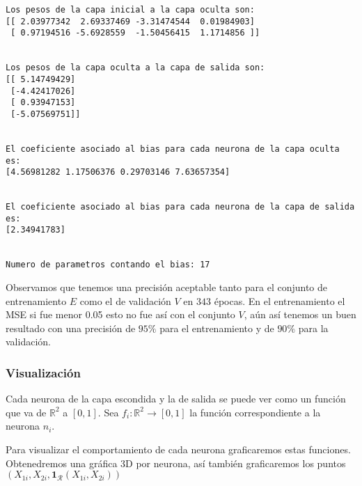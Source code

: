 \documentclass[11pt]{article}
\begin{document}
    \begin{Verbatim}[commandchars=\\\{\}]
Los pesos de la capa inicial a la capa oculta son:
[[ 2.03977342  2.69337469 -3.31474544  0.01984903]
 [ 0.97194516 -5.6928559  -1.50456415  1.1714856 ]]


Los pesos de la capa oculta a la capa de salida son:
[[ 5.14749429]
 [-4.42417026]
 [ 0.93947153]
 [-5.07569751]]


El coeficiente asociado al bias para cada neurona de la capa oculta es:
[4.56981282 1.17506376 0.29703146 7.63657354]


El coeficiente asociado al bias para cada neurona de la capa de salida es:
[2.34941783]


Numero de parametros contando el bias: 17
    \end{Verbatim}

    Observamos que tenemos una precisión aceptable tanto para el conjunto de
entrenamiento \(E\) como el de validación \(V\) en \(343\) épocas. En el
entrenamiento el MSE si fue menor 0.05 esto no fue así con el conjunto
\(V\), aún así tenemos un buen resultado con una precisión de \(95\%\)
para el entrenamiento y de \(90\%\) para la validación.

    \hypertarget{visualizaciuxf3n}{%
\subsubsection{Visualización}\label{visualizaciuxf3n}}

    Cada neurona de la capa escondida y la de salida se puede ver como un
función que va de \(\mathbb{R}^2\) a \([0,1]\). Sea
\(f_i: \mathbb{R}^2\to [0,1]\) la función correspondiente a la neurona
\(n_i\).

    Para visualizar el comportamiento de cada neurona graficaremos estas
funciones. Obtenedremos una gráfica 3D por neurona, así también
graficaremos los puntos
\((X_{1i},X_{2i},\mathbf{1}_{\mathcal{R}}(X_{1i},X_{2i}))\)
\end{document}
